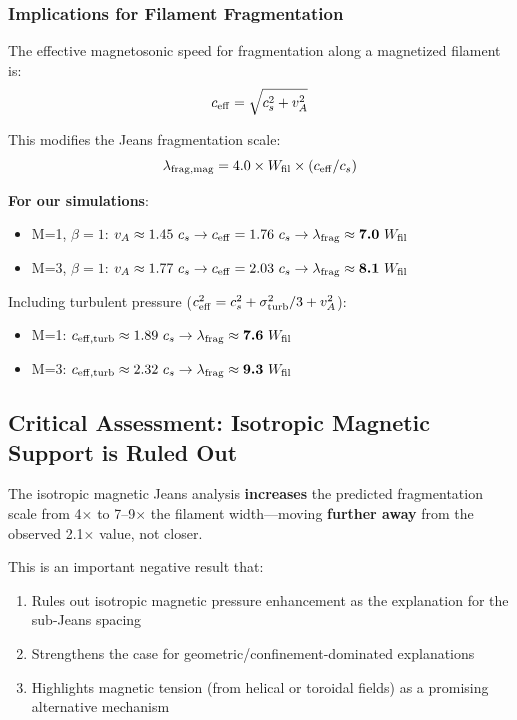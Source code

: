 \documentclass[11pt,a4paper]{article}
\begin{document}
\subsubsection{Implications for Filament Fragmentation}

The effective magnetosonic speed for fragmentation along a magnetized filament is:
\begin{equation}
c_{\rm eff} = \sqrt{c_s^2 + v_A^2}
\end{equation}

This modifies the Jeans fragmentation scale:
\begin{equation}
\lambda_{{\rm frag}, {\rm mag}} = 4.0 \times W_{\rm fil} \times (c_{\rm eff}/c_s)
\end{equation}

\textbf{For our simulations}:
\begin{itemize}
    \item M=1, $\beta=1$: $v_A \approx 1.45~c_s \rightarrow c_{\rm eff} = 1.76~c_s \rightarrow \lambda_{\rm frag} \approx \textbf{7.0}~W_{\rm fil}$
    \item M=3, $\beta=1$: $v_A \approx 1.77~c_s \rightarrow c_{\rm eff} = 2.03~c_s \rightarrow \lambda_{\rm frag} \approx \textbf{8.1}~W_{\rm fil}$
\end{itemize}

Including turbulent pressure ($c_{\rm eff}^2 = c_s^2 + \sigma_{\rm turb}^2/3 + v_A^2$):
\begin{itemize}
    \item M=1: $c_{\rm eff, turb} \approx 1.89~c_s \rightarrow \lambda_{\rm frag} \approx \textbf{7.6}~W_{\rm fil}$
    \item M=3: $c_{\rm eff, turb} \approx 2.32~c_s \rightarrow \lambda_{\rm frag} \approx \textbf{9.3}~W_{\rm fil}$
\end{itemize}

\subsection{Critical Assessment: Isotropic Magnetic Support is Ruled Out}

The isotropic magnetic Jeans analysis \textbf{increases} the predicted fragmentation scale from 4$\times$ to 7--9$\times$ the filament width—moving \textbf{further away} from the observed 2.1$\times$ value, not closer.

This is an important negative result that:
\begin{enumerate}
    \item Rules out isotropic magnetic pressure enhancement as the explanation for the sub-Jeans spacing
    \item Strengthens the case for geometric/confinement-dominated explanations
    \item Highlights magnetic tension (from helical or toroidal fields) as a promising alternative mechanism
\end{enumerate}
\end{document}
